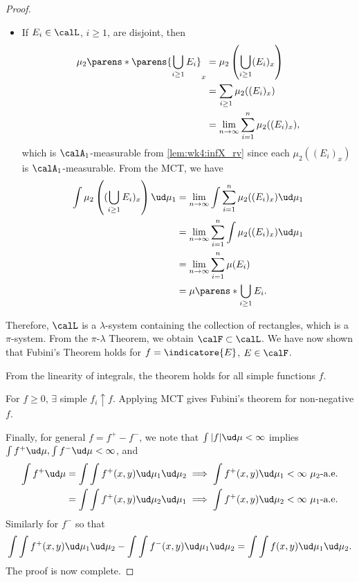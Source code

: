 \documentclass[../aipt.tex]{subfiles}
\begin{document}
\begin{proof}
\begin{itemize}
\item If $E_i \in \calL$, $i\geq 1$, are disjoint, then
\begin{align*}
\mu_2\parens*{\parens{\bigcup_{i \geq 1}E_i}_x}
&=\mu_2\left(\bigcup_{i \geq 1}({E_i})_x\right) \\
& = \sum_{i \geq 1} \mu_2((E_i)_x)\\
& =\lim_{n \to \infty} \sum_{i=1}^n \mu_2((E_i)_x),
\end{align*}
which is $\calA_1$-measurable from \cref{lem:wk4:infX_rv} since each $\mu_2((E_i)_x)$ is $\calA_1$-measurable. From the MCT, we have
\begin{align*}
\int \mu_2\left((\bigcup_{i \geq 1}{E_i})_x\right) \ud \mu_1 
& = \lim_{n \to \infty}{\int \sum_{i = 1}^n{\mu_2 ((E_i)_x} )\ud \mu_1 }\\
& =  \lim_{n \to \infty}{\sum_{i = 1}^n{\int \mu_2 ((E_i)_x} )\ud \mu_1 }\\
& = \lim_{n \to \infty}\sum_{i=1}^n \mu (E_i)\\
& = \mu\parens*{\bigcup_{i \geq 1} {E_i}}.
\end{align*}
\end{itemize}
Therefore, $\calL$ is a $\lambda$-system containing the collection of rectangles, which is a $\pi$-system. From the $\pi$-$\lambda$ Theorem, we obtain $\calF \subset \calL$. We have now shown that Fubini's Theorem holds for $f=\indicatore{E}$, $E \in \calF$.

From the linearity of integrals, the theorem holds for all simple functions $f$.

For $f \geq 0$, $\exists$ simple $f_i \uparrow f$. Applying MCT gives Fubini's theorem for non-negative $f$.

Finally, for general $f=f^+-f^-$, we note that $\int |f| \ud \mu <\infty$ implies $\int f^+ \ud \mu, \int f^- \ud \mu<\infty$, and
\begin{align*}
\int f^+ \ud \mu = \int \int f^+(x,y) \ud \mu_1 \ud \mu_2 \implies  \int f^+(x,y) \ud \mu_1 <\infty\ \text{$\mu_2$-a.e.} \\
= \int \int f^+(x,y) \ud \mu_2 \ud \mu_1 \implies  \int f^+(x,y) \ud \mu_2 <\infty\ \text{$\mu_1$-a.e.} 
\end{align*}
Similarly for $f^-$ so that
\begin{align*}
 \int \int f^+(x,y) \ud \mu_1 \ud \mu_2 - \int \int f^-(x,y) \ud \mu_1 \ud \mu_2 = \int \int f(x,y) \ud \mu_1 \ud \mu_2.
\end{align*}
The proof is now complete.
\end{proof}
\end{document}
